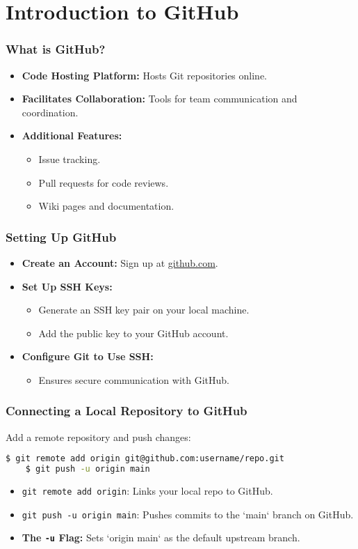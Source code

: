 \section{Introduction to GitHub}

\begin{frame}
	\frametitle{What is GitHub?}
	\begin{itemize}
		\item \textbf{Code Hosting Platform:} Hosts Git repositories online.
		\item \textbf{Facilitates Collaboration:} Tools for team communication and coordination.
		\item \textbf{Additional Features:}
		\begin{itemize}
			\item Issue tracking.
			\item Pull requests for code reviews.
			\item Wiki pages and documentation.
		\end{itemize}
	\end{itemize}
\end{frame}

\begin{frame}
	\frametitle{Setting Up GitHub}
	\begin{itemize}
		\item \textbf{Create an Account:} Sign up at \href{https://github.com}{github.com}.
		\item \textbf{Set Up SSH Keys:}
		\begin{itemize}
			\item Generate an SSH key pair on your local machine.
			\item Add the public key to your GitHub account.
		\end{itemize}
		\item \textbf{Configure Git to Use SSH:}
		\begin{itemize}
			\item Ensures secure communication with GitHub.
		\end{itemize}
	\end{itemize}
\end{frame}


\begin{frame}[fragile]
	\frametitle{Connecting a Local Repository to GitHub}
	Add a remote repository and push changes:
	\begin{lstlisting}[language=bash]
	$ git remote add origin git@github.com:username/repo.git
	$ git push -u origin main
	\end{lstlisting}
	\begin{itemize}
		\item \texttt{git remote add origin}: Links your local repo to GitHub.
		\item \texttt{git push -u origin main}: Pushes commits to the `main` branch on GitHub.
		\item \textbf{The \texttt{-u} Flag:} Sets `origin main` as the default upstream branch.
	\end{itemize}
\end{frame}

